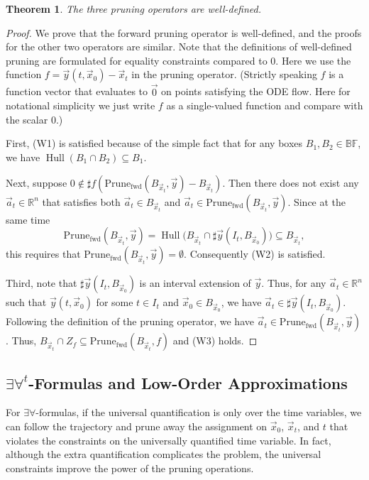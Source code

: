 \documentclass[12pt]{article}
\newtheorem{theorem}{Theorem}[section]
\DeclareMathOperator{\Hull}{Hull}
\begin{document}
\begin{theorem}
The three pruning operators are well-defined.
\end{theorem}

\begin{proof}
We prove that the forward pruning operator is well-defined, and the proofs for the other two operators are similar. Note that the definitions of well-defined pruning are formulated for equality constraints compared to 0. Here we use the function $f = \vec y (t, \vec x_0)-\vec x_t$ in the pruning operator. (Strictly speaking $f$ is a function vector that evaluates to $\vec 0$ on points satisfying the ODE flow. Here for notational simplicity we just write $f$ as a single-valued function and compare with the scalar $0$.)

First, (W1) is satisfied because of the simple fact that for any boxes $B_1,B_2\in \mathbb{BF}$, we have $\Hull(B_1\cap B_2)\subseteq B_1$.

Next, suppose $0\not\in\sharp f(\mathrm{Prune}_{\mathrm{fwd}}(B_{\vec x_t},\vec y)-B_{\vec x_t})$. Then there does not exist any $\vec a_t\in \mathbb{R}^n$ that satisfies both $\vec a_t\in B_{\vec x_t}$ and $\vec a_t\in \mathrm{Prune_{\mathrm{fwd}}}(B_{\vec x_t}, \vec y)$. Since at the same time
$$\mathrm{Prune}_{\mathrm{fwd}}(B_{\vec x_t}, \vec y) = \Hull\Big(B_{\vec x_t}\cap \sharp \vec y(I_t, B_{\vec x_0})\Big)\subseteq B_{\vec x_t},$$
this requires that $\mathrm{Prune}_{\mathrm{fwd}}(B_{\vec x_t}, \vec y) = \emptyset$. Consequently (W2) is satisfied.

Third, note that $\sharp \vec y(I_t, B_{\vec x_0})$ is an interval extension of $\vec y$. Thus, for any $\vec a_t\in \mathbb{R}^n$ such that $\vec y(t, \vec x_0)$ for some $t\in I_t$ and $\vec x_0\in B_{\vec x_0}$, we have $\vec a_t\in \sharp\vec y(I_t, B_{\vec x_0})$. Following the definition of the pruning operator, we have $\vec a_t\in \mathrm{Prune}_{\mathrm{fwd}}(B_{\vec x_t}, \vec y)$. Thus, $B_{\vec x_t}\cap Z_f \subseteq \mathrm{Prune}_{\mathrm{fwd}}(B_{\vec x_t},f)$ and (W3) holds.
\end{proof}

\subsection{$\exists\forall^t$-Formulas and Low-Order Approximations}

For $\exists\forall$-formulas, if the universal quantification is only over the time variables, we can follow the trajectory and prune away the assignment on $\vec x_0$, $\vec x_t$, and $t$ that violates the constraints on the universally quantified time variable. In fact, although the extra quantification complicates the problem, the universal constraints improve the power of the pruning operations.
\end{document}
